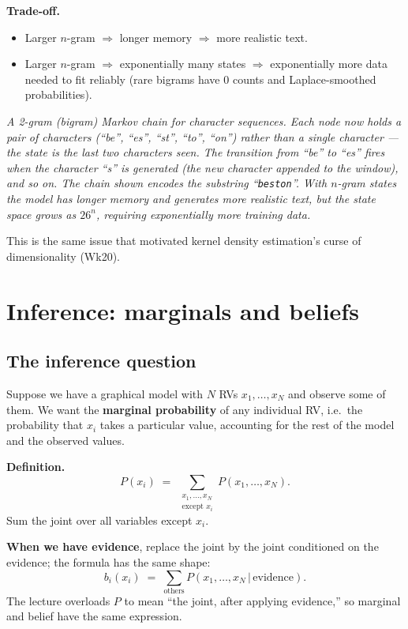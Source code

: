 \documentclass[11pt, a4paper]{article}
\begin{document}
\textbf{Trade-off.}
\begin{itemize}
  \item Larger $n$-gram $\Rightarrow$ longer memory $\Rightarrow$ more realistic text.
  \item Larger $n$-gram $\Rightarrow$ exponentially many states $\Rightarrow$ exponentially more data needed to fit reliably (rare bigrams have 0 counts and Laplace-smoothed probabilities).
\end{itemize}

\begin{center}

\footnotesize\textit{A 2-gram (bigram) Markov chain for character sequences. Each node now holds a \emph{pair} of characters (``be'', ``es'', ``st'', ``to'', ``on'') rather than a single character --- the state is the last two characters seen. The transition from ``be'' to ``es'' fires when the character ``s'' is generated (the new character appended to the window), and so on. The chain shown encodes the substring ``\texttt{beston}''. With $n$-gram states the model has longer memory and generates more realistic text, but the state space grows as $26^n$, requiring exponentially more training data.}
\end{center}

This is the same issue that motivated kernel density estimation's curse of dimensionality (Wk20).

\section{Inference: marginals and beliefs}

\subsection{The inference question}

Suppose we have a graphical model with $N$ RVs $x_1, \ldots, x_N$ and observe some of them. We want the \textbf{marginal probability} of any individual RV, i.e.\ the probability that $x_i$ takes a particular value, accounting for the rest of the model and the observed values.

\textbf{Definition.}
\[
P(x_i) \;=\; \sum_{\substack{x_1, \ldots, x_N \\ \text{except } x_i}} P(x_1, \ldots, x_N).
\]
Sum the joint over all variables except $x_i$.

\textbf{When we have evidence}, replace the joint by the joint conditioned on the evidence; the formula has the same shape:
\[
b_i(x_i) \;=\; \sum_{\text{others}} P(x_1, \ldots, x_N \,|\, \text{evidence}).
\]
The lecture overloads $P$ to mean ``the joint, after applying evidence,'' so marginal and belief have the same expression.
\end{document}
